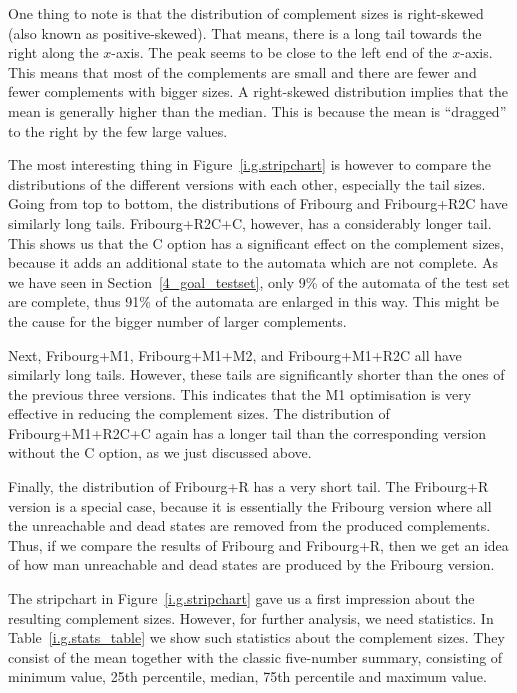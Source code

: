 One thing to note is that the distribution of complement sizes is right-skewed (also known as positive-skewed). That means, there is a long tail towards the right along the $x$-axis. The peak seems to be close to the left end of the $x$-axis. This means that most of the complements are small and there are fewer and fewer complements with bigger sizes. A right-skewed distribution implies that the mean is generally higher than the median. This is because the mean is ``dragged'' to the right by the few large values.

The most interesting thing in Figure~\ref{i.g.stripchart} is however to compare the distributions of the different versions with each other, especially the tail sizes. Going from top to bottom, the distributions of Fribourg and Fribourg+R2C have similarly long tails. Fribourg+R2C+C, however, has a considerably longer tail. This shows us that the C option has a significant effect on the complement sizes, because it adds an additional state to the automata which are not complete. As we have seen in Section~\ref{4_goal_testset}, only 9\% of the automata of the \goal{} test set are complete, thus 91\% of the automata are enlarged in this way. This might be the cause for the bigger number of larger complements.

Next, Fribourg+M1, Fribourg+M1+M2, and Fribourg+M1+R2C all have similarly long tails. However, these tails are significantly shorter than the ones of the previous three versions. This indicates that the M1 optimisation is very effective in reducing the complement sizes. The distribution of Fribourg+M1+R2C+C again has a longer tail than the corresponding version without the C option, as we just discussed above.

Finally, the distribution of Fribourg+R has a very short tail. The Fribourg+R version is a special case, because it is essentially the Fribourg version where all the unreachable and dead states are removed from the produced complements. Thus, if we compare the results of Fribourg and Fribourg+R, then we get an idea of how man unreachable and dead states are produced by the Fribourg version.

The stripchart in Figure~\ref{i.g.stripchart} gave us a first impression about the resulting complement sizes. However, for further analysis, we need statistics. In Table~\ref{i.g.stats_table} we show such statistics about the complement sizes. They consist of the mean together with the classic five-number summary, consisting of minimum value, 25th percentile, median, 75th percentile and maximum value.

